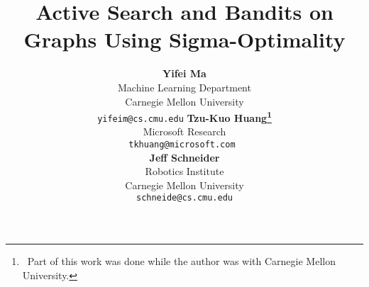 \documentclass[]{article}
\title{Active Search and Bandits on Graphs Using Sigma-Optimality}
\author{ {\bf Yifei Ma} \\
Machine Learning Department \\
Carnegie Mellon University \\
{\tt yifeim@cs.cmu.edu}
\And
{\bf Tzu-Kuo Huang\thanks{ \, Part of this work was done while the author was with Carnegie Mellon University. }}  \\
Microsoft Research   \\
{\tt tkhuang@microsoft.com } \\
\And
{\bf Jeff Schneider}   \\
Robotics Institute \\
Carnegie Mellon University \\
{\tt schneide@cs.cmu.edu}
}
\begin{document}
\maketitle

\iffalse 

Many modern information access problems involve highly complex
patterns that cannot be handled by traditional keyword based search.
Active Search is an emerging paradigm that helps users quickly find
relevant information by efficiently collecting and learning from user
feedback. We consider active search on graphs, where the nodes
represent the set of instances users want to search over and the edges
encode pairwise similarity among the instances. Existing active search
algorithms are either short of theoretical guarantees or inadequate
for graph data. Motivated by recent advances in active learning on
graphs, namely the Sigma-optimality selection criterion, we propose
new active search algorithms suitable for graphs with theoretical
guarantees and demonstrate their effectiveness on several real-world
datasets.

We relate our active search setting to multi-armed bandits whose
rewards are binary values indicating search hits or misses and arms
cannot be pulled more than once. We also discussed theoretical
guarantees for applying Sigma-optimality as the exploration term for
bandits on graphs.



\fi
\end{document}
